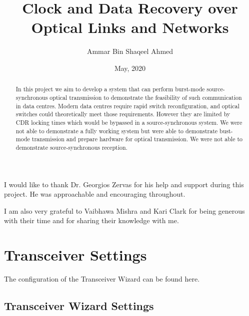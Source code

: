 \documentclass[oneside]{discothesis}
\title{Clock and Data Recovery over Optical Links and Networks}
\author{Ammar Bin Shaqeel Ahmed}
\institute{University College London}
\date{May, 2020}
\begin{document}
\frontmatter %
\maketitle
\cleardoublepage

\begin{acknowledgements}
I would like to thank Dr. Georgios Zervas for his help and support during this
project. He was approachable and encouraging throughout. 

\noindent
I am also very grateful to Vaibhawa Mishra and Kari Clark for being generous
with their time and for sharing their knowledge with me. 

\end{acknowledgements}

\begin{abstract}
In this project we aim to develop a system that can perform burst-mode
source-synchronous optical transmission to demonstrate the feasibility of
such communication in data centres. Modern data centres require
rapid switch reconfiguration, and optical switches could theoretically meet
those requirements. However they are limited by CDR locking times which would be
bypassed in a source-synchronous system.  We were not able to demonstrate a
fully working system but were able to demonstrate bust-mode transmission and
prepare hardware for optical transmission. We were not able to demonstrate
source-synchronous reception.


\end{abstract}

\tableofcontents

\mainmatter %










\appendix
\chapter{Transceiver Settings}%
\label{cha:transceiver_settings}
The configuration of the Transceiver Wizard can be found here.

\section{Transceiver Wizard Settings}%
\label{sec:transceiver_wizard_settings}
\end{document}
